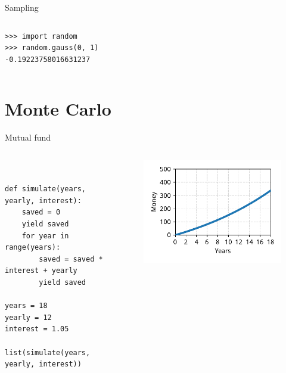 \documentclass[12pt, aspectratio=149]{beamer}
\theoremstyle{plain}
\begin{document}
\begin{frame}[fragile]{Sampling}
\begin{columns}
\begin{column}{0.5\textwidth}
\begin{center}
\begin{figure}
     \end{figure}
      \begin{verbatim}
>>> import random
>>> random.gauss(0, 1)
-0.19223758016631237
      \end{verbatim}
     \end{center}
\end{column}
\end{columns}
\end{frame}

\section{Monte Carlo}

\begin{frame}[fragile]{Mutual fund}
\begin{columns}
\begin{column}{0.55\textwidth}
    \begin{center}
     \begin{verbatim} 


def simulate(years, yearly, interest):
    saved = 0
    yield saved
    for year in range(years):
        saved = saved * interest + yearly
        yield saved
        
years = 18
yearly = 12
interest = 1.05

list(simulate(years, yearly, interest))
     \end{verbatim}
     \end{center}
\end{column}
\begin{column}{0.45\textwidth}  %
    \begin{center}
     \begin{figure}
     	\centering
     	\includegraphics[width=0.99\linewidth]{figures/mutual_fund}
     \end{figure}
     \end{center}
\end{column}
\end{columns}
\end{frame}
\end{document}
